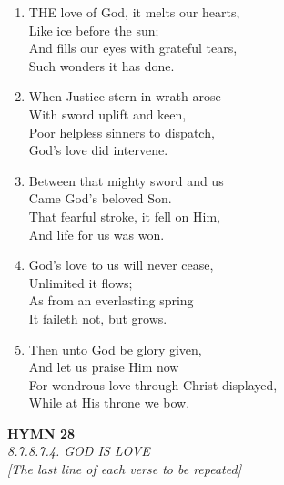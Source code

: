 \begin{enumerate}
    \item THE love of God, it melts our hearts, \\
        Like ice before the sun; \\
        And fills our eyes with grateful tears, \\
        Such wonders it has done.

    \item When Justice stern in wrath arose \\
        With sword uplift and keen, \\
        Poor helpless sinners to dispatch, \\
        God's love did intervene.

    \item Between that mighty sword and us \\
        Came God's beloved Son. \\
        That fearful stroke, it fell on Him, \\
        And life for us was won.

    \item God's love to us will never cease, \\
        Unlimited it flows; \\
        As from an everlasting spring \\
        It faileth not, but grows.

    \item Then unto God be glory given, \\
        And let us praise Him now \\
        For wondrous love through Christ displayed, \\
        While at His throne we bow.

\end{enumerate}

\newpage
\begin{center}
    {\Large \textbf{HYMN 28}}
    \\
    \textit{8.7.8.7.4. GOD IS LOVE}
    \\
    \textit{\small [The last line of each verse to be repeated]}
\end{center}
\vspace{1em}

